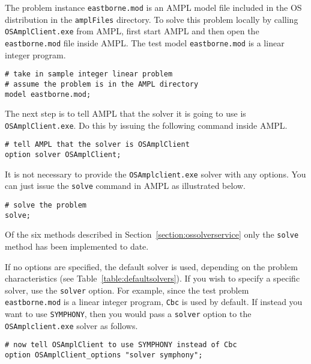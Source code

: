 The  problem instance {\tt eastborne.mod} is an AMPL model file included in the OS distribution 
in the {\tt amplFiles} directory.  To solve this problem locally 
by calling {\tt OSAmplClient.exe} from AMPL, first start AMPL and then open the {\tt eastborne.mod} file 
inside AMPL.  The test model {\tt eastborne.mod} is a linear integer program. 

\begin{verbatim}
# take in sample integer linear problem
# assume the problem is in the AMPL directory
model eastborne.mod;
\end{verbatim}

The next step is to tell AMPL that the solver it is going to use is {\tt OSAmplClient.exe}. 
Do this by issuing the following command inside AMPL.

\begin{verbatim}
# tell AMPL that the solver is OSAmplClient
option solver OSAmplClient;
\end{verbatim}

It is not necessary to provide the  {\tt OSAmplclient.exe} solver with any options. 
You can just issue the {\tt solve} command in AMPL as illustrated below.  

\begin{verbatim}
# solve the problem
solve;
\end{verbatim}

Of the six methods described in Section~\ref{section:ossolverservice} only the {\tt solve} method 
has been implemented to date.

If no options are specified, the default solver is used, depending on the problem characteristics 
(see Table~\ref{table:defaultsolvers}).
If you wish to specify a specific solver, use the {\tt solver} option.   For example,  
since the test problem {\tt eastborne.mod} is a linear integer program, {\tt Cbc} is used by default. 
If instead you want to  use {\tt SYMPHONY},
then you would pass a {\tt solver} option to the {\tt OSAmplclient.exe} solver as follows.%

\begin{verbatim}
# now tell OSAmplClient to use SYMPHONY instead of Cbc
option OSAmplClient_options "solver symphony";
\end{verbatim}

